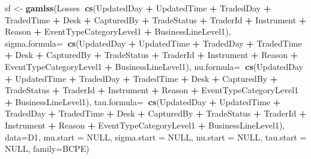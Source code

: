 \documentclass[]{DissertateUSU}
\newenvironment{Shaded}{\begin{snugshade}}{\end{snugshade}}
\newcommand{\KeywordTok}[1]{\textcolor[rgb]{0.13,0.29,0.53}{\textbf{#1}}}
\newcommand{\DataTypeTok}[1]{\textcolor[rgb]{0.13,0.29,0.53}{#1}}
\newcommand{\StringTok}[1]{\textcolor[rgb]{0.31,0.60,0.02}{#1}}
\newcommand{\OtherTok}[1]{\textcolor[rgb]{0.56,0.35,0.01}{#1}}
\newcommand{\OperatorTok}[1]{\textcolor[rgb]{0.81,0.36,0.00}{\textbf{#1}}}
\newcommand{\NormalTok}[1]{#1}
\begin{document}
\begin{Shaded}
\begin{Highlighting}[]
\NormalTok{sf <-}\StringTok{ }\KeywordTok{gamlss}\NormalTok{(Losses}\OperatorTok{~}\KeywordTok{cs}\NormalTok{(UpdatedDay }\OperatorTok{+}\StringTok{ }\NormalTok{UpdatedTime }\OperatorTok{+}\StringTok{ }\NormalTok{TradedDay }\OperatorTok{+}\StringTok{ }\NormalTok{TradedTime}
      \OperatorTok{+}\StringTok{ }\NormalTok{Desk }\OperatorTok{+}\StringTok{ }\NormalTok{CapturedBy }\OperatorTok{+}\StringTok{ }\NormalTok{TradeStatus }\OperatorTok{+}\StringTok{ }\NormalTok{TraderId }\OperatorTok{+}\StringTok{ }\NormalTok{Instrument }\OperatorTok{+}\StringTok{ }\NormalTok{Reason}
      \OperatorTok{+}\StringTok{ }\NormalTok{EventTypeCategoryLevel1 }\OperatorTok{+}\StringTok{ }\NormalTok{BusinessLineLevel1), }
\DataTypeTok{sigma.formula=}\OperatorTok{~}\KeywordTok{cs}\NormalTok{(UpdatedDay }\OperatorTok{+}\StringTok{ }\NormalTok{UpdatedTime }\OperatorTok{+}\StringTok{ }\NormalTok{TradedDay }\OperatorTok{+}\StringTok{ }\NormalTok{TradedTime }\OperatorTok{+}\StringTok{ }\NormalTok{Desk}
      \OperatorTok{+}\StringTok{ }\NormalTok{CapturedBy }\OperatorTok{+}\StringTok{ }\NormalTok{TradeStatus }\OperatorTok{+}\StringTok{ }\NormalTok{TraderId }\OperatorTok{+}\StringTok{ }\NormalTok{Instrument }\OperatorTok{+}\StringTok{ }\NormalTok{Reason }\OperatorTok{+}
\StringTok{        }\NormalTok{EventTypeCategoryLevel1 }\OperatorTok{+}\StringTok{ }\NormalTok{BusinessLineLevel1),}
\DataTypeTok{nu.formula=}\OperatorTok{~}\KeywordTok{cs}\NormalTok{(UpdatedDay }\OperatorTok{+}\StringTok{ }\NormalTok{UpdatedTime }\OperatorTok{+}\StringTok{ }\NormalTok{TradedDay }\OperatorTok{+}\StringTok{ }\NormalTok{TradedTime }\OperatorTok{+}\StringTok{ }\NormalTok{Desk }\OperatorTok{+}\StringTok{ }
\StringTok{      }\NormalTok{CapturedBy }\OperatorTok{+}\StringTok{ }\NormalTok{TradeStatus }\OperatorTok{+}\StringTok{ }\NormalTok{TraderId }\OperatorTok{+}\StringTok{ }\NormalTok{Instrument }\OperatorTok{+}\StringTok{ }\NormalTok{Reason }\OperatorTok{+}\StringTok{ }
\StringTok{      }\NormalTok{EventTypeCategoryLevel1 }\OperatorTok{+}\StringTok{ }\NormalTok{BusinessLineLevel1),}
 \DataTypeTok{tau.formula=}\OperatorTok{~}\KeywordTok{cs}\NormalTok{(UpdatedDay }\OperatorTok{+}\StringTok{ }\NormalTok{UpdatedTime }\OperatorTok{+}\StringTok{ }\NormalTok{TradedDay }\OperatorTok{+}\StringTok{ }\NormalTok{TradedTime }\OperatorTok{+}\StringTok{ }\NormalTok{Desk }\OperatorTok{+}
\StringTok{      }\NormalTok{CapturedBy }\OperatorTok{+}\StringTok{ }\NormalTok{TradeStatus }\OperatorTok{+}\StringTok{ }\NormalTok{TraderId }\OperatorTok{+}\StringTok{ }\NormalTok{Instrument }\OperatorTok{+}\StringTok{ }\NormalTok{Reason }\OperatorTok{+}
\StringTok{      }\NormalTok{EventTypeCategoryLevel1 }\OperatorTok{+}\StringTok{ }\NormalTok{BusinessLineLevel1),}
\DataTypeTok{data=}\NormalTok{D1, }\DataTypeTok{mu.start =} \OtherTok{NULL}\NormalTok{,  }\DataTypeTok{sigma.start =} \OtherTok{NULL}\NormalTok{, }\DataTypeTok{nu.start =} \OtherTok{NULL}\NormalTok{,}
                                            \DataTypeTok{tau.start =} \OtherTok{NULL}\NormalTok{, }\DataTypeTok{family=}\NormalTok{BCPE)}
\end{Highlighting}
\end{Shaded}
\end{document}
